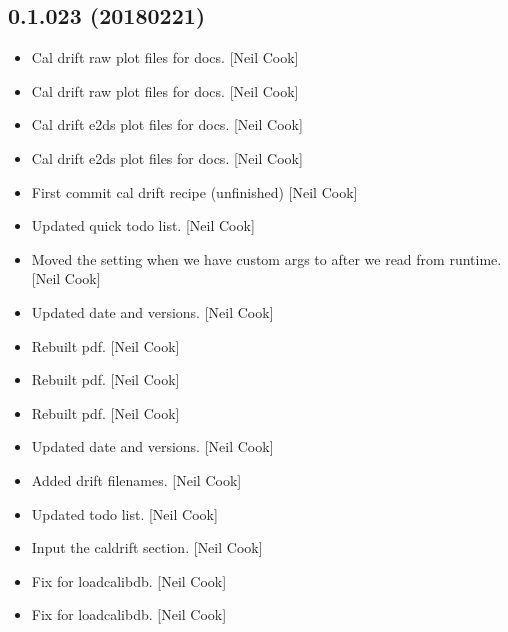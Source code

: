 \documentclass[a4paper,10pt,english]{report}
\begin{document}
\subsection{0.1.023 (2018\sphinxhyphen{}02\sphinxhyphen{}21)}
\label{\detokenize{misc/changelog:id500}}\begin{itemize}
\item {} 
Cal drift raw plot files for docs. {[}Neil Cook{]}

\item {} 
Cal drift raw plot files for docs. {[}Neil Cook{]}

\item {} 
Cal drift e2ds plot files for docs. {[}Neil Cook{]}

\item {} 
Cal drift e2ds plot files for docs. {[}Neil Cook{]}

\item {} 
First commit \sphinxhyphen{} cal drift recipe (unfinished) {[}Neil Cook{]}

\item {} 
Updated quick todo list. {[}Neil Cook{]}

\item {} 
Moved the  setting when we have custom args
to after we read from runtime. {[}Neil Cook{]}

\item {} 
Updated date and versions. {[}Neil Cook{]}

\item {} 
Rebuilt pdf. {[}Neil Cook{]}

\item {} 
Rebuilt pdf. {[}Neil Cook{]}

\item {} 
Rebuilt pdf. {[}Neil Cook{]}

\item {} 
Updated date and versions. {[}Neil Cook{]}

\item {} 
Added drift filenames. {[}Neil Cook{]}

\item {} 
Updated todo list. {[}Neil Cook{]}

\item {} 
Input the caldrift section. {[}Neil Cook{]}

\item {} 
Fix for loadcalibdb. {[}Neil Cook{]}

\item {} 
Fix for loadcalibdb. {[}Neil Cook{]}

\end{itemize}
\end{document}
